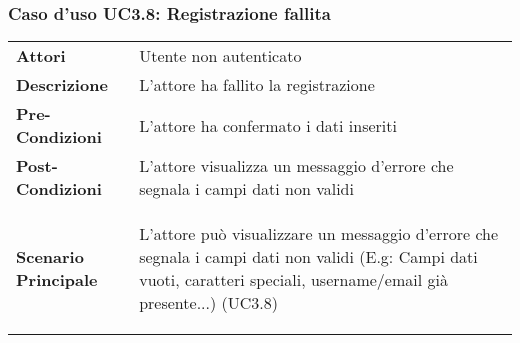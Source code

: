 \subsubsection{Caso d'uso UC3.8: Registrazione fallita}
\label{UC3_8}

\begin{minipage}{\linewidth}
\begin{longtable}{ l | p{11cm}}
	\hline
	\rowcolor{Gray}
	 \multicolumn{2}{c}{UC3.8 - Registrazione fallita} \\
	 \hline
	\textbf{Attori} & Utente non autenticato \\
	\textbf{Descrizione} & L'attore ha fallito la registrazione  \\
	\textbf{Pre-Condizioni} & L'attore ha confermato i dati inseriti \\
	\textbf{Post-Condizioni} & L'attore visualizza un messaggio d'errore che segnala i campi dati non validi \\
	\textbf{Scenario Principale} & \begin{enumerate*}[label=(\arabic*.),itemjoin={\newline}]
		\item L'attore può visualizzare un messaggio d'errore che segnala i campi dati non validi (E.g: Campi dati vuoti, caratteri speciali, username/email già presente...) (UC3.8)
	\end{enumerate*}\\
\end{longtable}
\end{minipage}